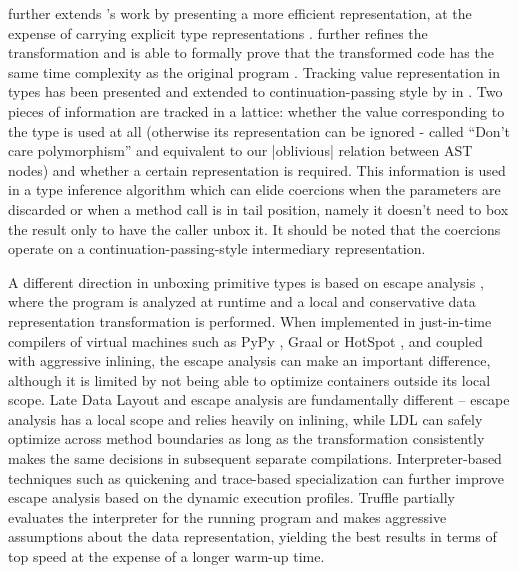  further extends 's work \cite{shao-compiler-ml, shao-flexible-representation-analysis} by presenting a more efficient representation, at the expense of carrying explicit type representations \cite{harper-intensional-type-analysis, tarditi-til}.  further refines the transformation and is able to formally prove that the transformed code has the same time complexity as the original program \cite{minamide-unboxing-runtime-complexity}. Tracking value representation in types has been presented and extended to continuation-passing style \cite{flanagan-essence-cps} by  in \cite{thiemann-unboxed-objects-cps}. Two pieces of information are tracked in a lattice: whether the value corresponding to the type is used at all (otherwise its representation can be ignored - called ``Don't care polymorphism'' and equivalent to our |oblivious| relation between AST nodes) and whether a certain representation is required. This information is used in a type inference algorithm which can elide coercions when the parameters are discarded or when a method call is in tail position, namely it doesn't need to box the result only to have the caller unbox it. It should be noted that the coercions operate on a continuation-passing-style intermediary representation.

A different direction in unboxing primitive types is based on escape analysis \cite{escape-analysis-first-paper}, where the program is analyzed at runtime and a local and conservative data representation transformation is performed. When implemented in just-in-time compilers \cite{stadler-escape-analysis} of virtual machines such as PyPy \cite{bolz-pypy-tracing-jit}, Graal \cite{graal} or HotSpot \cite{hotspot-c2}, and coupled with aggressive inlining, the escape analysis can make an important difference, although it is limited by not being able to optimize containers outside its local scope. Late Data Layout and escape analysis are fundamentally different -- escape analysis has a local scope and relies heavily on inlining, while LDL can safely optimize across method boundaries as long as the transformation consistently makes the same decisions in subsequent separate compilations. Interpreter-based techniques such as quickening \cite{quickening} and trace-based specialization \cite{tracemonkey} can further improve escape analysis based on the dynamic execution profiles. Truffle \cite{truffle} partially evaluates the interpreter for the running program and makes aggressive assumptions about the data representation, yielding the best results in terms of top speed at the expense of a longer warm-up time.

